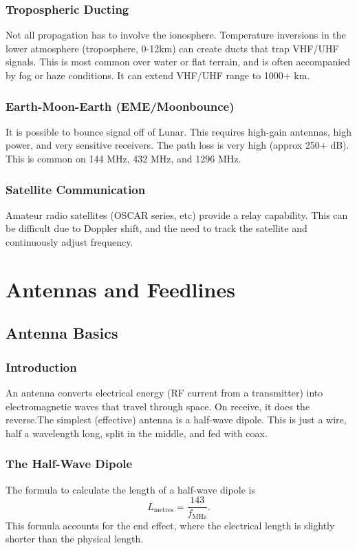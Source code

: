 \documentclass{article}
\begin{document}
\subsubsection{Tropospheric Ducting}
Not all propagation has to involve the ionosphere. Temperature inversions in the lower atmosphere (troposphere, 0-12km) can create ducts that trap VHF/UHF signals. This is most common over water or flat terrain, and is often accompanied by fog or haze conditions. It can extend VHF/UHF range to 1000+ km.

\subsubsection{Earth-Moon-Earth (EME/Moonbounce)}
It is possible to bounce signal off of Lunar. This requires high-gain antennas, high power, and very sensitive receivers. The path loss is very high (approx 250+ dB). This is common on 144 MHz, 432 MHz, and 1296 MHz.

\subsubsection{Satellite Communication}
Amateur radio satellites (OSCAR series, etc) provide a relay capability. This can be difficult due to Doppler shift, and the need to track the satellite and continuously adjust frequency.

\section{Antennas and Feedlines}
\subsection{Antenna Basics}
\subsubsection{Introduction}
An antenna converts electrical energy (RF current from a transmitter) into electromagnetic waves that travel through space. On receive, it does the reverse.The simplest (effective) antenna is a half-wave dipole. This is just a wire, half a wavelength long, split in the middle, and fed with coax.

\subsubsection{The Half-Wave Dipole}
The formula to calculate the length of a half-wave dipole is
\[
    L_{\text{metres}}=\frac{143}{f_{\text{MHz}}}.
\]
This formula accounts for the end effect, where the electrical length is slightly shorter than the physical length.
\end{document}
